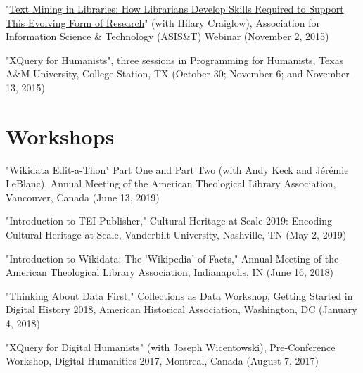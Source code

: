\documentclass[10pt]{res} %
\begin{document}
\begin{resume}
\begin{hangparas}{.25in}{1}"\href{https://www.asist.org/events/webinars/text-mining-in-libraries/}{Text Mining in Libraries: How Librarians Develop Skills Required to Support This Evolving Form of Research}" (with Hilary Craiglow), Association for Information Science \& Technology (ASIS\&T) Webinar (November 2, 2015)\end{hangparas}

\begin{hangparas}{.25in}{1}"\href{http://programming4humanists.tamu.edu/syllabus-fall-2015/}{XQuery for Humanists}", three sessions in Programming for Humanists, Texas A\&M University, College Station, TX (October 30; November 6; and November 13, 2015)\end{hangparas}

\section{Workshops}

\begin{hangparas}{.25in}{1}"Wikidata Edit-a-Thon" Part One and Part Two (with Andy Keck and Jérémie LeBlanc), Annual Meeting of the American Theological Library Association, Vancouver, Canada (June 13, 2019)\end{hangparas}

\begin{hangparas}{.25in}{1}"Introduction to TEI Publisher," Cultural Heritage at Scale 2019: Encoding Cultural Heritage at Scale, Vanderbilt University, Nashville, TN (May 2, 2019)\end{hangparas}

\begin{hangparas}{.25in}{1}"Introduction to Wikidata: The 'Wikipedia' of Facts," Annual Meeting of the American Theological Library Association, Indianapolis, IN (June 16, 2018)\end{hangparas}

\begin{hangparas}{.25in}{1}"Thinking About Data First," Collections as Data Workshop, Getting Started in Digital History 2018, American Historical Association, Washington, DC (January 4, 2018)\end{hangparas}

\begin{hangparas}{.25in}{1}"XQuery for Digital Humanists" (with Joseph Wicentowski), Pre-Conference Workshop, Digital Humanities 2017, Montreal, Canada (August 7, 2017)\end{hangparas}


\end{resume}
\end{document}
